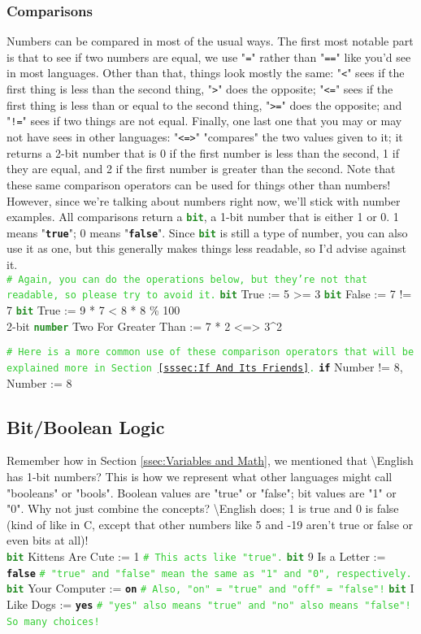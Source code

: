 \documentclass{article}
\newcommand{\English}{\textbackslash{}English}				%
\newcommand{\ssecl}[1]{\subsection{#1}\label{ssec:#1}}
\newcommand{\sssecl}[1]{\subsubsection{#1}\label{sssec:#1}}
\newcommand{\codecomment}[1]{\texttt{\textcolor{LimeGreen}{#1}}}
\newcommand{\commentline}[1]{\codecomment{\# #1}}
\newcommand{\type}[1]{\texttt{\textcolor{ForestGreen}{\textbf{#1}}}}
\newcommand{\common}[1]{\texttt{\textcolor{Mulberry}{\textbf{#1}}}}
\newenvironment{code}[0]
{\ttfamily{}				%
\setlength\parindent{0cm}	%
~\\}
{\setlength\parindent{1cm}
~\\}
\begin{document}
\sssecl{Comparisons}
\indent Numbers can be compared in most of the usual ways. The first most notable part is that to see if two numbers are equal, we use "\texttt{=}" rather than "\texttt{==}" like you'd see in most languages. Other than that, things look mostly the same: "\texttt{<}" sees if the first thing is less than the second thing, "\texttt{>}" does the opposite; "\texttt{<=}" sees if the first thing is less than or equal to the second thing, "\texttt{>=}" does the opposite; and "\texttt{!=}" sees if two things are not equal. Finally, one last one that you may or may not have sees in other languages: "\texttt{<=>}" "compares" the two values given to it; it returns a 2-bit number that is 0 if the first number is less than the second, 1 if they are equal, and 2 if the first number is greater than the second. Note that these same comparison operators can be used for things other than numbers! However, since we're talking about numbers right now, we'll stick with number examples.
\indent All comparisons return a \type{bit}, a 1-bit number that is either 1 or 0. 1 means "\common{true}"; 0 means "\common{false}". Since \type{bit} is still a type of number, you can also use it as one, but this generally makes things less readable, so I'd advise against it.
\begin{code}
\commentline{Again, you can do the operations below, but they're not that readable, so please try to avoid it.}
\type{bit} True := 5 >= 3
\type{bit} False := 7 != 7
\type{bit} True := 9 * 7 < 8 * 8 \% 100\\
2-bit \type{number} Two For Greater Than := 7 * 2 <=> 3\^{}2

\commentline{Here is a more common use of these comparison operators that will be explained more in Section \ref{sssec:If And Its Friends}.}
\common{if} Number != 8,
	Number := 8
\end{code}

\ssecl{Bit/Boolean Logic}
\indent Remember how in Section \ref{ssec:Variables and Math}, we mentioned that \English{} has 1-bit numbers? This is how we represent what other languages might call "booleans" or "bools". Boolean values are "true" or "false"; bit values are "1" or "0". Why not just combine the concepts? \English{} does; 1 is true and 0 is false (kind of like in C, except that other numbers like 5 and -19 aren't true or false or even bits at all)!
\begin{code}
\type{bit} Kittens Are Cute := 1 \commentline{This acts like "true".}
\type{bit} 9 Is a Letter := \common{false} \commentline{"true" and "false" mean the same as "1" and "0", respectively.}
\type{bit} Your Computer := \common{on} \commentline{Also, "on" = "true" and "off" = "false"!}
\type{bit} I Like Dogs := \common{yes} \commentline{"yes" also means "true" and "no" also means "false"! So many choices!}
\end{code}
\end{document}
